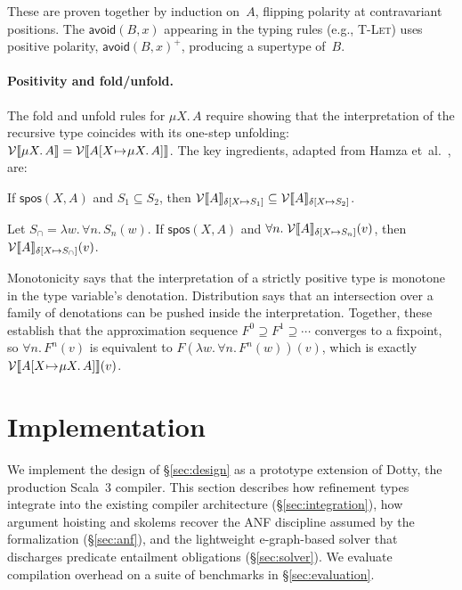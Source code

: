 \documentclass[acmsmall]{acmart}
\newcommand{\bind}{\mathchoice{\mathbin{\!\mapsto\!}}{\mathbin{\!\mapsto\!}}{\mapsto}{\mapsto}}
\begin{document}
\noindent These are proven together by induction on~$A$, flipping polarity at contravariant positions. The $\textsf{avoid}(B, x)$ appearing in the typing rules (e.g., \textsc{T-Let}) uses positive polarity, $\textsf{avoid}(B, x)^{+}$, producing a supertype of~$B$.

\paragraph{Positivity and fold/unfold.}
The fold and unfold rules for $\mu X.\, A$ require showing that the interpretation of the recursive type coincides with its one-step unfolding: $\mathcal{V}\llbracket \mu X.\, A \rrbracket = \mathcal{V}\llbracket A[X \bind \mu X.\, A] \rrbracket$. The key ingredients, adapted from Hamza et~al.~\cite{hamza2019}, are:

\begin{lemma}[Monotonicity]\label{lem:spos-mono}
  If $\textsf{spos}(X, A)$ and $S_1 \subseteq S_2$, then
  $\mathcal{V}\llbracket A \rrbracket_{\delta[X \bind S_1]} \subseteq \mathcal{V}\llbracket A \rrbracket_{\delta[X \bind S_2]}$.
\end{lemma}

\begin{lemma}[Distribution]\label{lem:spos-distrib}
  Let $S_\cap = \lambda w.\, \forall n.\, S_n(w)$.
  If $\textsf{spos}(X, A)$ and $\forall n.\; \mathcal{V}\llbracket A \rrbracket_{\delta[X \bind S_n]}(v)$, then
  $\mathcal{V}\llbracket A \rrbracket_{\delta[X \bind S_\cap]}(v)$.
\end{lemma}

\noindent Monotonicity says that the interpretation of a strictly positive type is monotone in the type variable's denotation. Distribution says that an intersection over a family of denotations can be pushed inside the interpretation. Together, these establish that the approximation sequence $F^0 \supseteq F^1 \supseteq \cdots$ converges to a fixpoint, so $\forall n.\, F^n(v)$ is equivalent to $F(\lambda w.\, \forall n.\, F^n(w))(v)$, which is exactly $\mathcal{V}\llbracket A[X \bind \mu X.\, A] \rrbracket(v)$.


\section{Implementation}\label{sec:implementation}

We implement the design of \S\ref{sec:design} as a prototype extension of Dotty, the production Scala~3 compiler. This section describes how refinement types integrate into the existing compiler architecture (\S\ref{sec:integration}), how argument hoisting and skolems recover the ANF discipline assumed by the formalization (\S\ref{sec:anf}), and the lightweight e-graph-based solver that discharges predicate entailment obligations (\S\ref{sec:solver}). We evaluate compilation overhead on a suite of benchmarks in \S\ref{sec:evaluation}.
\end{document}
